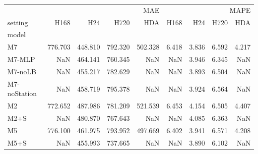 \begin{tabular}{lrrrrrrrr}
\toprule
 & \multicolumn{4}{r}{MAE} & \multicolumn{4}{r}{MAPE} \\
setting & H168 & H24 & H720 & HDA & H168 & H24 & H720 & HDA \\
model &  &  &  &  &  &  &  &  \\
\midrule
M7 & 776.703 & 448.810 & 792.320 & 502.328 & 6.418 & 3.836 & 6.592 & 4.217 \\
M7-MLP & NaN & 464.141 & 760.345 & NaN & NaN & 3.946 & 6.345 & NaN \\
M7-noLB & NaN & 455.217 & 782.629 & NaN & NaN & 3.893 & 6.504 & NaN \\
M7-noStation & NaN & 458.719 & 795.378 & NaN & NaN & 3.924 & 6.564 & NaN \\
M2 & 772.652 & 487.986 & 781.209 & 521.539 & 6.453 & 4.154 & 6.505 & 4.407 \\
M2+S & NaN & 480.870 & 767.643 & NaN & NaN & 4.085 & 6.363 & NaN \\
M5 & 776.100 & 461.975 & 793.952 & 497.669 & 6.402 & 3.941 & 6.571 & 4.208 \\
M5+S & NaN & 455.993 & 737.665 & NaN & NaN & 3.890 & 6.102 & NaN \\
\bottomrule
\end{tabular}
